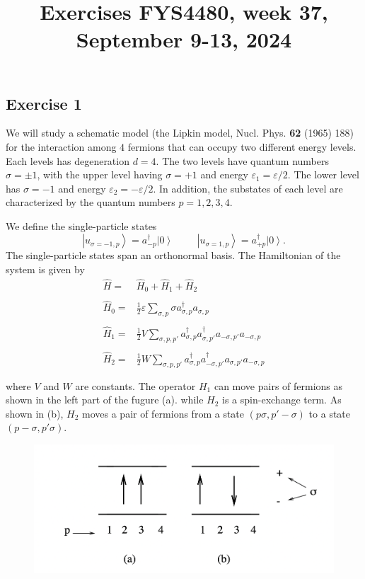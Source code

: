 \documentclass[prc]{revtex4}
\newcommand{\ket}[1]{\left| #1 \right\rangle}
\begin{document}
\title{Exercises FYS4480, week 37, September 9-13, 2024}
\maketitle
\subsection*{Exercise 1}

We will study a schematic model (the Lipkin model, Nucl.
Phys. {\bf 62} (1965) 188) for the interaction among  $4$
fermions that can occupy two different energy levels. Each levels has degeneration $d=4$. The two levels have quantum numbers $\sigma=\pm 1$,
with the upper level having  $\sigma=+1$ and energy
$\varepsilon_{1}=
\varepsilon/2$. The lower level  has $\sigma=-1$ and energy
$\varepsilon_{2}=-\varepsilon/2$. 
In addition, the substates  of each level are characterized  
by the quantum numbers $p=1,2,3,4$.

We define the single-particle states
\[
\ket{u_{\sigma =-1,p}}=a_{-p}^{\dagger}\ket{0}
\hspace{1cm}
\ket{u_{\sigma =1,p}}=a_{+p}^{\dagger}\ket{0}.
\]
The single-particle states span an orthonormal basis.
The Hamiltonian of the system is given by
\[
\begin{array}{ll}
\hat{H}=&\hat{H}_{0}+\hat{H}_{1}+\hat{H}_{2}\\
&\\
\hat{H}_{0}=&\frac{1}{2}\varepsilon\sum_{\sigma ,p}\sigma
a_{\sigma,p}^{\dagger}a_{\sigma ,p}\\
&\\
\hat{H}_{1}=&\frac{1}{2}V\sum_{\sigma ,p,p'}
a_{\sigma,p}^{\dagger}a_{\sigma ,p'}^{\dagger}
a_{-\sigma ,p'}a_{-\sigma ,p}\\
&\\
\hat{H}_{2}=&\frac{1}{2}W\sum_{\sigma ,p,p'}
a_{\sigma,p}^{\dagger}a_{-\sigma ,p'}^{\dagger}
a_{\sigma ,p'}a_{-\sigma ,p}\\
&\\
\end{array}
\]
where $V$ and $W$ are constants. The operator 
$H_{1}$ can move pairs of fermions as shown in the left part of the fugure (a).
while $H_{2}$ is a spin-exchange term.
As shown in (b),
$H_{2}$ moves a pair of fermions from a state $(p\sigma ,p' -\sigma)$ to a state
$(p-\sigma ,p'\sigma)$.
\begin{figure}[hbtp]
\centering
\includegraphics[width=.6\textwidth]{lipkin.png}
\end{figure}
\end{document}
